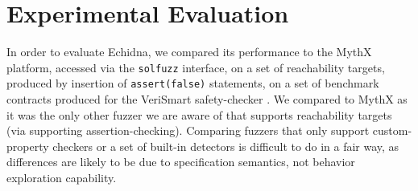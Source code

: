 \section{Experimental Evaluation}

In order to evaluate Echidna, we compared its performance to the MythX platform, accessed via the {\tt solfuzz} interface, on a set of reachability targets, produced by insertion of {\tt assert(false)} statements, on a set of benchmark contracts \cite{vsbenchmark} produced for the VeriSmart safety-checker \cite{VeriSmart}.  We compared to MythX as it was the only other fuzzer we are aware of that supports reachability targets (via supporting assertion-checking).  Comparing fuzzers that only support custom-property checkers or a set of built-in detectors is difficult to do in a fair way, as differences are likely to be due to specification semantics, not behavior exploration capability.
